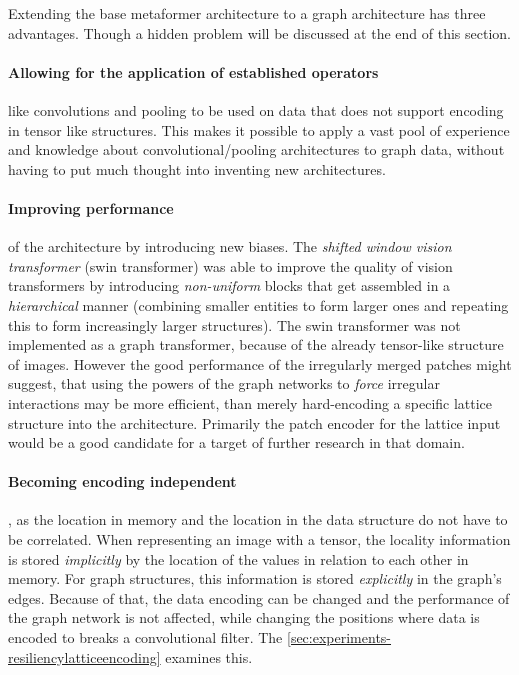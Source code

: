 Extending the base metaformer architecture to a graph architecture has three advantages. 
Though a hidden problem will be discussed at the end of this section.

\paragraph{Allowing for the application of established operators} like convolutions and pooling to be used on data that does not support encoding in tensor like structures. 
This makes it possible to apply a vast pool of experience and knowledge about convolutional/pooling architectures to graph data, without having to put much thought into inventing new architectures.

\paragraph{Improving performance} of the architecture by introducing new biases.
The \emph{shifted window vision transformer} (swin transformer) \cite{swinTransformerPaper} was able to improve the quality of vision transformers by introducing \emph{non-uniform} blocks that get assembled in a \emph{hierarchical} manner (combining smaller entities to form larger ones and repeating this to form increasingly larger structures).
The swin transformer was not implemented as a graph transformer, because of the already tensor-like structure of images. 
However the good performance of the irregularly merged patches might suggest, that using the powers of the graph networks to \emph{force} irregular interactions may be more efficient, than merely hard-encoding a specific lattice structure into the architecture.
Primarily the patch encoder for the lattice input would be a good candidate for a target of further research in that domain.

\paragraph{Becoming encoding independent}, as the location in memory and the location in the data structure do not have to be correlated. 
When representing an image with a tensor, the locality information is stored \emph{implicitly} by the location of the values in relation to each other in memory. 
For graph structures, this information is stored \emph{explicitly} in the graph's edges.
Because of that, the data encoding can be changed and the performance of the graph network is not affected, while changing the positions where data is encoded to breaks a convolutional filter.
The \autoref{sec:experiments-resiliencylatticeencoding} examines this.\\

